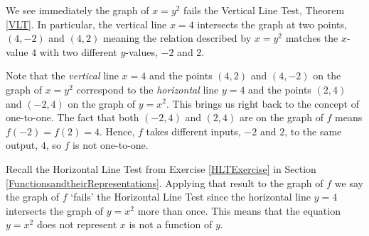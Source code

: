 \documentclass{ximera}
\begin{document}




 


\begin{center}
\end{center}


We see immediately the graph of $x = y^2$ fails the Vertical Line Test, Theorem \ref{VLT}.  In particular,  the vertical line $x=4$ intersects the graph at two points, $(4,-2)$ and $(4,2)$ meaning the relation described by $x = y^2$ matches the $x$-value $4$ with two different $y$-values, $-2$ and $2$.  

Note that the \textit{vertical} line $x=4$ and the points $(4,2)$ and $(4, -2)$ on the graph of $x=y^2$ correspond to the \textit{horizontal} line $y=4$ and the points $(2, 4)$ and $(-2,4)$ on the graph of $y = x^2$.   This brings us right back to the concept of one-to-one.  The fact that both $(-2,4)$ and $(2,4)$ are on the graph of $f$ means $f(-2)=f(2) = 4$.  Hence,  $f$ takes different inputs, $-2$ and $2$, to the same output, $4$, so $f$ is not one-to-one.

Recall the Horizontal Line Test from Exercise \ref{HLTExercise} in Section \ref{FunctionsandtheirRepresentations}.  Applying that result to the graph of $f$ we say the graph of $f$ `fails' the Horizontal Line Test  since the horizontal line $y=4$ intersects the graph of $y = x^2$ more than once.  This means that the equation $y=x^2$ does not represent $x$ is not a function of $y$.  
\end{document}
